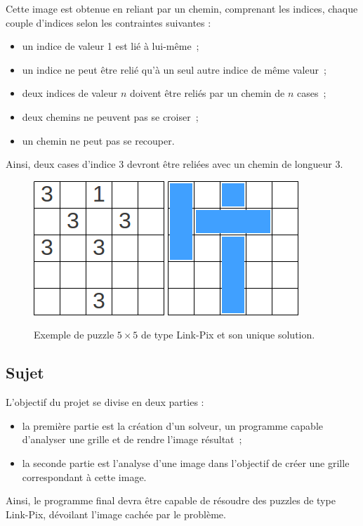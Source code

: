 Cette image est obtenue en reliant par un chemin, comprenant les indices, chaque couple d'indices selon les contraintes suivantes :
\begin{itemize}
    \item un indice de valeur 1 est lié à lui-même~;
    \item un indice ne peut être relié qu'à un seul autre indice de même valeur~;
    \item deux indices de valeur $n$ doivent être reliés par un chemin de $n$ cases~;
    \item deux chemins ne peuvent pas se croiser~;
    \item un chemin ne peut pas se recouper.
\end{itemize}
Ainsi, deux cases d'indice 3 devront être reliées avec un chemin de longueur 3.
\begin{figure}[h]
      \centering
      \includegraphics[scale=0.5]{puzzle01}
      \includegraphics[scale=0.5]{puzzle01-sol}
      \caption{Exemple de puzzle $5 \times 5$ de type Link-Pix et son unique solution.}
\end{figure}

    \subsection{Sujet}
    L'objectif du projet se divise en deux parties :
    \begin{itemize}
    \item la première partie est la création d'un solveur, un programme capable d'analyser une grille et de rendre l'image résultat~;
    \item la seconde partie est l'analyse d'une image dans l'objectif de créer une grille correspondant à cette image.
    \end{itemize}
    Ainsi, le programme final devra être capable de résoudre des puzzles de type Link-Pix, dévoilant l'image cachée par le problème.

